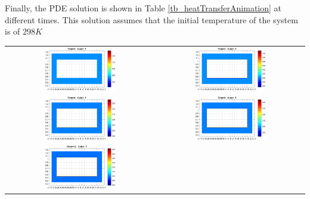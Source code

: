 \documentclass{article}
\begin{document}

Finally, the PDE solution is shown in Table \ref{tb_heatTransferAnimation} at different times. This solution assumes that the initial temperature of the system is of $298 K$

\begin{center}
\begin{longtable}{c  c}
    \includegraphics[width=0.5\textwidth]{./img/a00.png} &
    \includegraphics[width=0.5\textwidth]{./img/a02.png} \\
    \includegraphics[width=0.5\textwidth]{./img/a04.png} &
    \includegraphics[width=0.5\textwidth]{./img/a08.png} \\
    \includegraphics[width=0.5\textwidth]{./img/a12.png} &

\end{longtable}
\end{center}
\end{document}

